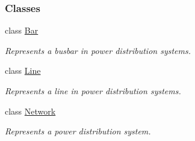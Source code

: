 \subsubsection*{Classes}
\begin{DoxyCompactItemize}
\item 
class \hyperlink{class_bar}{Bar}
\begin{DoxyCompactList}\small\item\em Represents a busbar in power distribution systems. \end{DoxyCompactList}\item 
class \hyperlink{class_line}{Line}
\begin{DoxyCompactList}\small\item\em Represents a line in power distribution systems. \end{DoxyCompactList}\item 
class \hyperlink{class_network}{Network}
\begin{DoxyCompactList}\small\item\em Represents a power distribution system. \end{DoxyCompactList}\end{DoxyCompactItemize}

